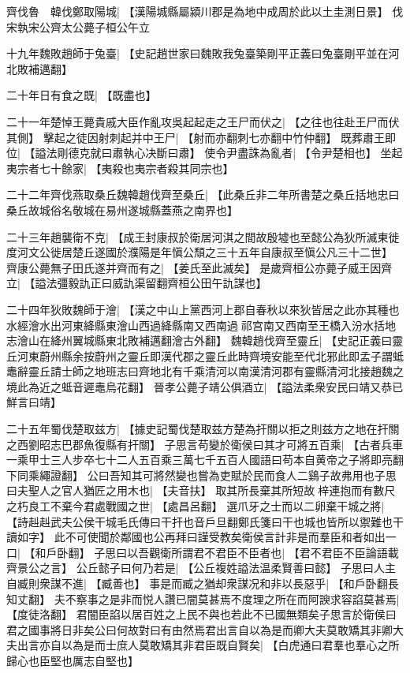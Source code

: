 齊伐魯　韓伐鄭取陽城|{
	【漢陽城縣屬潁川郡是為地中成周於此以土圭測日景】}
伐宋執宋公齊太公薨子桓公午立
\par
十九年魏敗趙師于兔臺|{
	【史記趙世家曰魏敗我兔臺築剛平正義曰兔臺剛平並在河北敗補邁翻】}
\par
二十年日有食之既|{
	【既盡也】}
\par
二十一年楚悼王薨貴戚大臣作亂攻吳起起走之王尸而伏之|{
	【之往也往赴王尸而伏其側】}
擊起之徒因射刺起并中王尸|{
	【射而亦翻刺七亦翻中竹仲翻】}
既葬肅王即位|{
	【謚法剛德克就曰肅執心决斷曰肅】}
使令尹盡誅為亂者|{
	【令尹楚相也】}
坐起夷宗者七十餘家|{
	【夷殺也夷宗者殺其同宗也】}
\par
二十二年齊伐燕取桑丘魏韓趙伐齊至桑丘|{
	【此桑丘非二年所書楚之桑丘括地忠曰桑丘故城俗名敬城在易州遂城縣蓋燕之南界也】}
\par
二十三年趙襲衛不克|{
	【成王封康叔於衛居河淇之間故殷墟也至懿公為狄所滅東徙度河文公徙居楚丘遂國於濮陽是年愼公頹之三十五年自康叔至愼公凡三十二世】}
齊康公薨無子田氏遂并齊而有之|{
	【姜氏至此滅矣】}
是歲齊桓公亦薨子威王因齊立|{
	【謚法彊毅訅正曰威訅渠留翻齊桓公田午訅謀也】}
\par
二十四年狄敗魏師于澮|{
	【漢之中山上黨西河上郡自春秋以來狄皆居之此亦其種也水經澮水出河東絳縣東澮山西過絳縣南又西南過祁宫南又西南至王橋入汾水括地志澮山在絳州翼城縣東北敗補邁翻澮古外翻】}
魏韓趙伐齊至靈丘|{
	【史記正義曰靈丘河東蔚州縣余按蔚州之靈丘即漢代郡之靈丘此時齊境安能至代北邪此即孟子謂蚳鼃辭靈丘請士師之地班志曰齊地北有千乘清河以南漢清河郡有靈縣清河北接趙魏之境此為近之蚳音遲鼃烏花翻】}
晉孝公薨子靖公俱酒立|{
	【謚法柔衆安民曰靖又恭已鮮言曰靖】}
\par
二十五年蜀伐楚取兹方|{
	【據史記蜀伐楚取兹方楚為扞關以拒之則兹方之地在扞關之西劉昭志巴郡魚復縣有扞關】}
子思言苟變於衛侯曰其才可將五百乘|{
	【古者兵車一乘甲士三人步卒七十二人五百乘三萬七千五百人國語曰苟本自黄帝之子將即亮翻下同乘繩證翻】}
公曰吾知其可將然變也嘗為吏賦於民而食人二鷄子故弗用也子思曰夫聖人之官人猶匠之用木也|{
	【夫音扶】}
取其所長棄其所短故梓連抱而有數尺之朽良工不棄今君處戰國之世|{
	【處昌呂翻】}
選爪牙之士而以二卵棄干城之將|{
	【詩赳赳武夫公侯干城毛氏傳曰干扞也音戶旦翻鄭氏箋曰干也城也皆所以禦難也干讀如字】}
此不可使聞於鄰國也公再拜曰謹受教矣衛侯言計非是而羣臣和者如出一口|{
	【和戶卧翻】}
子思曰以吾觀衛所謂君不君臣不臣者也|{
	【君不君臣不臣論語載齊景公之言】}
公丘懿子曰何乃若是|{
	【公丘複姓謚法温柔賢善曰懿】}
子思曰人主自臧則衆謀不進|{
	【臧善也】}
事是而臧之猶却衆謀况和非以長惡乎|{
	【和戶卧翻長知丈翻】}
夫不察事之是非而悦人讚已闇莫甚焉不度理之所在而阿諛求容諂莫甚焉|{
	【度徒洛翻】}
君闇臣諂以居百姓之上民不與也若此不已國無類矣子思言於衛侯曰君之國事將日非矣公曰何故對曰有由然焉君出言自以為是而卿大夫莫敢矯其非卿大夫出言亦自以為是而士庶人莫敢矯其非君臣既自賢矣|{
	【白虎通曰君羣也羣心之所歸心也臣堅也厲志自堅也】}
